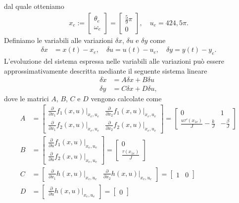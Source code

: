 \documentclass[a4paper, 11pt]{article}
\begin{document}
	dal quale otteniamo
	\begin{align}
		x_e := \begin{bmatrix}
			\theta_e \\
			\omega_e
		\end{bmatrix} = \begin{bmatrix}
			\frac{5}{9}\pi \\
			0
		\end{bmatrix},  \quad u_e = 424,5 \pi.\label{eq:equilibirum_pair}
	\end{align}
	Definiamo le variabili alle variazioni $\delta x$, $\delta u$ e $\delta y$ come 
	\begin{align*}
		\delta x &= x(t) - x_e, 
		\quad
		\delta u = u(t) - u_e, 
		\quad
		\delta y = y(t) - y_e.
	\end{align*}
	L'evoluzione del sistema espressa nelle variabili alle variazioni pu\`o essere approssimativamente descritta mediante il seguente sistema lineare
	\begin{subequations}\label{eq:linearized_system}
		\begin{align}
			\delta \dot{x} &= A\delta x + B\delta u
			\\
			\delta y &= C\delta x + D\delta u,
		\end{align}
	\end{subequations}
	dove le matrici $A$, $B$, $C$ e $D$ vengono calcolate come
	\newcommand{\pdv}[2]{\frac{\partial}{\partial #1}#2(x,u)|_{x_e,u_e}}
	\begin{subequations}\label{eq:matrices}
		\begin{align}
			A &=\begin{bmatrix}
				\pdv{x_1}{f_1} & \pdv{x_2}{f_1} \\
				\pdv{x_1}{f_2} & \pdv{x_2}{f_2}
			\end{bmatrix} = \begin{bmatrix}
				0 & 1 \\
				\frac{u\tau'(x_{1e})}{J} - \frac{k}{J} & - \frac{\beta}{J}
			\end{bmatrix}
			\\
			B &=\begin{bmatrix}
				\pdv{u}{f_1} \\
				\pdv{u}{f_2}
			\end{bmatrix} = \begin{bmatrix}
				0 \\
				\frac{\tau(x_{1e})}{J}
			\end{bmatrix}
			\\
			C &=\begin{bmatrix}
				\pdv{x_1}{h} & \pdv{x_2}{h}
			\end{bmatrix} = \begin{bmatrix}
				1 & 0
			\end{bmatrix}
			\\
			D &= \begin{bmatrix}
				\pdv{u}{h}
			\end{bmatrix} = \begin{bmatrix}
				0
			\end{bmatrix}
		\end{align}
	\end{subequations}
\end{document}
